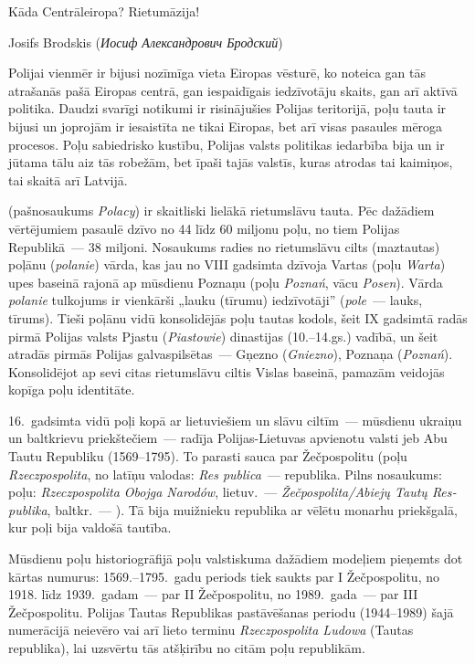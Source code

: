 \documentclass[twoside,a5paper,12pt,fleqn,openany]{extbook}
\newcommand{\pltxti}[1]{\textit{\textpolish{#1}}}
\newcommand{\rutxti}[1]{\textit{\textrussian{#1}}}
\newcommand{\detxti}[1]{\textit{\textgerman{#1}}}
\newcommand{\lttxti}[1]{\textit{\textlithuanian{#1}}}
\newcommand{\latxti}[1]{\textit{\textlatin{#1}}}
\newcommand{\betxti}[1]{\textit{\textbelarusian{#1}}}
\begin{document}
\epigraph
{Kāda Centrāleiropa? Rietumāzija!}
{Josifs Brodskis (\rutxti{Иосиф Александрович Бродский})}

Polijai vienmēr ir bijusi nozīmīga vieta Eiropas vēsturē, ko noteica gan tās atrašanās pašā Eiropas centrā, gan iespaidīgais iedzīvotāju skaits, gan arī aktīvā politika. Daudzi svarīgi notikumi ir risinājušies Polijas teritorijā, poļu tauta ir bijusi un joprojām ir iesaistīta ne tikai Eiropas, bet arī visas pasaules mēroga procesos. Poļu sabiedrisko kustību, Polijas valsts politikas iedarbība bija un ir jūtama tālu aiz tās robežām, bet īpaši tajās valstīs, kuras atrodas tai kaimiņos, tai skaitā arī Latvijā.

 (pašnosaukums \pltxti{Polacy}) ir skaitliski lielākā rietumslāvu tauta. Pēc dažādiem vērtējumiem pasaulē dzīvo no 44 līdz 60 miljonu poļu, no tiem Polijas Republikā~--- 38 miljoni. Nosaukums radies no rietumslāvu cilts (maztautas) poļānu (\pltxti{polanie}) vārda, kas jau no VIII gadsimta dzīvoja Vartas (poļu \pltxti{Warta}) upes baseinā rajonā ap mūsdienu Poznaņu (poļu \pltxti{Poznań}, vācu \detxti{Posen}). Vārda \pltxti{polanie} tulkojums ir vienkārši „lauku (tīrumu) iedzīvotāji” (\pltxti{pole}~--- lauks, tīrums). Tieši poļānu vidū konsolidējās poļu tautas kodols, šeit IX gadsimtā radās pirmā Polijas valsts Pjastu (\pltxti{Piastowie}) dinastijas (10.--14.gs.) vadībā, un šeit atradās pirmās Polijas galvaspilsētas~--- Gņezno (\pltxti{Gniezno}), Poznaņa (\pltxti{Poznań}). Konsolidējot ap sevi citas rietumslāvu ciltis Vislas baseinā, pamazām veidojās kopīga poļu identitāte.

16.~gadsimta vidū poļi kopā ar lietuviešiem un slāvu ciltīm~--- mūsdienu ukraiņu un baltkrievu priekštečiem~--- radīja Polijas-Lietuvas apvienotu valsti jeb Abu Tautu Republiku (1569--1795). To parasti sauca par Žečpospolitu (poļu \pltxti{Rzeczpospolita}, no latīņu valodas: \latxti{Res publica}~--- republika. Pilns nosaukums: poļu: \pltxti{Rzeczpospolita Obojga Narodów}, lietuv.~--- \lttxti{Žečpospolita/Abiejų Tautų Respublika}, baltkr.~--- \betxti{Рэч Паспалітая Абодвух Народаў}). Tā bija muižnieku republika ar vēlētu monarhu priekšgalā, kur poļi bija valdošā tautība.

Mūsdienu poļu historiogrāfijā poļu valstiskuma dažādiem modeļiem pieņemts dot kārtas numurus: 1569.--1795.~gadu periods tiek saukts par I Žečpospolitu, no 1918. līdz 1939.~gadam~--- par II Žečpospolitu, no 1989.~gada~--- par III Žečpospolitu. Polijas Tautas Republikas pastāvēšanas periodu (1944--1989) šajā numerācijā neievēro vai arī lieto terminu \pltxti{Rzeczpospolita Ludowa} (Tautas republika), lai uzsvērtu tās atšķirību no citām poļu republikām.
\end{document}
